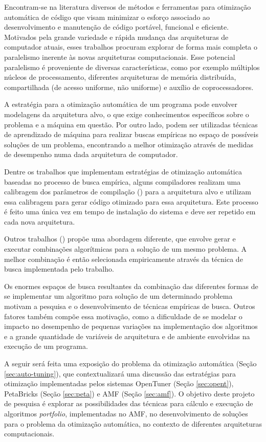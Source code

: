 \documentclass[a4paper, 12pt]{article}
\begin{document}
Encontram-se na literatura diversos de métodos e ferramentas para otimização
automática de código que visam minimizar o esforço associado ao desenvolvimento
e manutenção de código portável, funcional e eficiente. Motivados pela grande
variedade e rápida mudança das arquiteturas de computador atuais, esses
trabalhos procuram explorar de forma mais completa o paralelismo inerente às
novas arquiteturas computacionais. Esse potencial paralelismo é proveniente de
diversas características, como por exemplo múltiplos núcleos de processamento,
diferentes arquiteturas de memória distribuída, compartilhada (de acesso
uniforme, não uniforme) e auxílio de coprocessadores.

A estratégia para a otimização automática de um programa pode envolver
modelagens da arquitetura alvo, o que exige conhecimentos específicos sobre o
problema e a máquina em questão. Por outro lado, podem ser utilizadas técnicas
de aprendizado de máquina para realizar buscas empíricas no espaço de possíveis
soluções de um problema, encontrando a melhor otimização através de medidas de
desempenho numa dada arquitetura de computador.

Dentre os trabalhos que implementam estratégias de otimização automática
baseadas no processo de busca empírica, alguns compiladores realizam uma
calibragem dos parâmetros de compilação (\citet{bilmes1997,whaley1998}) para a
arquitetura alvo e utilizam essa calibragem para gerar código otimizado para
essa arquitetura. Este processo é feito uma única vez em tempo de instalação
do sistema e deve ser repetido em cada nova arquitetura.

Outros trabalhos (\citet{goldman2012framework,mitcsail-tr:2014,
vuduc2004}) propõe uma abordagem diferente, que envolve gerar e executar
combinações algorítmicas para a solução de um mesmo problema. A melhor
combinação é então selecionada empiricamente através da técnica de busca
implementada pelo trabalho.

Os enormes espaços de busca resultantes da combinação das diferentes formas de
se implementar um algoritmo para solução de um determinado problema motivam
a pesquisa e o desenvolvimento de técnicas empíricas de busca. Outros fatores
também compõe essa motivação, como a dificuldade de se modelar o impacto no
desempenho de pequenas variações na implementação dos algoritmos e a grande
quantidade de variáveis de arquitetura e de ambiente envolvidas na execução de
um programa.

A seguir será feita uma exposição do problema da otimização automática
(Seção \ref{sec:auto-tuning}), que contextualizará uma discussão das
estratégias para otimização implementadas pelos sistemas
OpenTuner (Seção \ref{sec:opent}), PetaBricks (Seção \ref{sec:peta}) e AMF
(Seção \ref{sec:amf}). O objetivo deste projeto de pesquisa é explorar as
possibilidades das técnicas para cálculo e execução de algoritmos
\emph{portfolio}, implementadas no AMF, no desenvolvimento de soluções para o
problema da otimização automática, no contexto de diferentes arquiteturas
computacionais.
\end{document}
